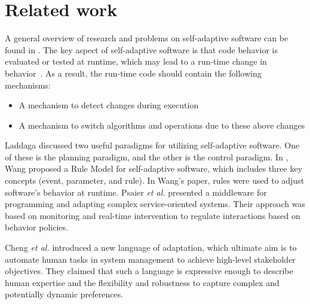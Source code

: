 \documentclass[runningheads,a4paper]{llncs}
\begin{document}
\section{Related work}\label{sec:Related work}

A general overview of research and problems on self-adaptive software can be found in \cite{Laddaga2006,Salehie2009}. The key aspect of self-adaptive software is that code behavior is evaluated or tested at runtime, which may lead to a run-time change in behavior~\cite{Laddaga2006}. As a result, the run-time code should contain the following mechanisms:
\begin{itemize}
\item A mechanism to detect changes during execution
\item A mechanism to switch algorithms and operations due to these above changes
\end{itemize}

Laddaga \cite{Laddaga2006} discussed two useful paradigms for utilizing self-adaptive software. One of these is the planning paradigm, and the other is the control paradigm. In \cite{Wang2005}, Wang proposed a Rule Model for self-adaptive software, which includes three key concepts (event, parameter, and rule). In Wang's paper, rules were used to adjust software's behavior at runtime.
Psaier \emph{et al.} \cite{Psaier2010} presented a middleware for programming and adapting complex service-oriented systems. Their approach was based on monitoring and real-time intervention to regulate interactions based on behavior policies.


Cheng \emph{et al.} \cite{Cheng2006} introduced a new language of adaptation, which ultimate aim is to automate human tasks in system management to achieve high-level stakeholder objectives. They claimed that such a language is expressive enough to describe human expertise and the flexibility and robustness to capture complex and potentially dynamic preferences.
\end{document}
